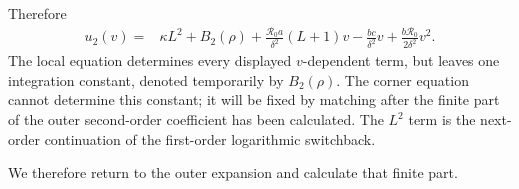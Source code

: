 \documentclass[11pt,a4paper]{article}
\newcommand{\Rzero}{\mathcal R_0}
\begin{document}
Therefore
\begin{equation}
\label{eq:u2pre}
\begin{split}
u_2(v)={}&\kappa L^2+B_2(\rho)
+\frac{\Rzero a}{\delta^2}(L+1)v
-\frac{bc}{\delta^2}v
+\frac{b\Rzero}{2\delta^2}v^2.
\end{split}
\end{equation}
The local equation determines every displayed $v$-dependent term, but leaves
one integration constant, denoted temporarily by $B_2(\rho)$.  The corner
equation cannot determine this constant; it will be fixed by matching after
the finite part of the outer second-order coefficient has been calculated.
The $L^2$ term is the next-order continuation of the first-order logarithmic
switchback.

We therefore return to the outer expansion and calculate that finite part.
\end{document}
